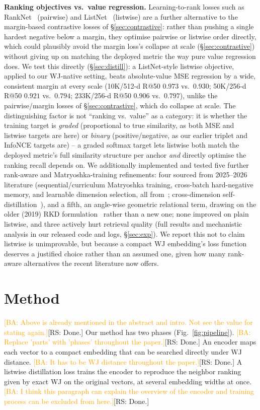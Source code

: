 \documentclass[conference]{IEEEtran}
\newcommand{\rs}[1]{\textcolor{green!55!black}{[RS: #1]}}
\newcommand{\ba}[1]{\textcolor{orange}{[BA: #1]}}
\begin{document}
\textbf{Ranking objectives vs.\ value regression.} Learning-to-rank losses such as
RankNet~\cite{burges05} (pairwise) and ListNet~\cite{cao07} (listwise) are a
further alternative to the margin-based contrastive losses of
\S\ref{sec:contrastive}: rather than pushing a single hardest negative below a
margin, they optimise pairwise or listwise order directly, which could plausibly
avoid the margin loss's collapse at scale (\S\ref{sec:contrastive}) without giving
up on matching the deployed metric the way pure value regression does. We test
this directly (\S\ref{sec:distill}): a ListNet-style listwise objective, applied to
our WJ-native setting, beats absolute-value MSE regression by a wide, consistent
margin at every scale (10K/512-d R@50 $0.973$ vs.\ $0.930$; 50K/256-d R@50 $0.921$
vs.\ $0.794$; 233K/256-d R@50 $0.906$ vs.\ $0.797$), unlike the pairwise/margin
losses of \S\ref{sec:contrastive}, which do collapse at scale. The distinguishing
factor is not ``ranking vs.\ value'' as a category: it is whether the training
target is \emph{graded} (proportional to true similarity, as both MSE and listwise
targets are here) or \emph{binary} (positive/negative, as our earlier triplet and
InfoNCE targets are) -- a graded softmax target lets listwise both match the
deployed metric's full similarity structure per anchor \emph{and} directly optimise
the ranking recall depends on. We additionally implemented and tested five further
rank-aware and Matryoshka-training refinements: four sourced from 2025--2026
literature (sequential/curriculum Matryoshka training, cross-batch hard-negative
memory, and learnable dimension selection, all from~\cite{smec25}; cross-dimension
self-distillation~\cite{mipic26}), and a fifth, an angle-wise geometric relational
term, drawing on the older (2019) RKD formulation~\cite{park19rkd} rather than a new
one; none improved on plain listwise, and three actively hurt retrieval quality (full
results and mechanistic analysis in
our released code and logs, \S\ref{sec:exp}). We report this not to claim
listwise is unimprovable, but because a compact WJ embedding's loss function
deserves a justified choice rather than an assumed one, given how many rank-aware
alternatives the recent literature now offers.

\section{Method}
\label{sec:method}
\ba{Above is already mentioned in the abstract and intro. Not see the value for stating again.}\rs{Done.}
Our method has two
phases (Fig.~\ref{fig:pipeline}).
\ba{Replace 'parts' with 'phases' throughout the paper.}\rs{Done.}
An encoder maps each vector to a compact embedding
that can be searched directly under WJ distance.
\ba{It has to be WJ distance throughout the paper.}\rs{Done.}
A listwise distillation loss trains the
encoder to reproduce the neighbor ranking given by exact WJ on the original vectors,
at several embedding widths at once.
\ba{I think this paragraph can explain the overview of the encoder and training process can be excluded from here.}\rs{Done.}
\end{document}
